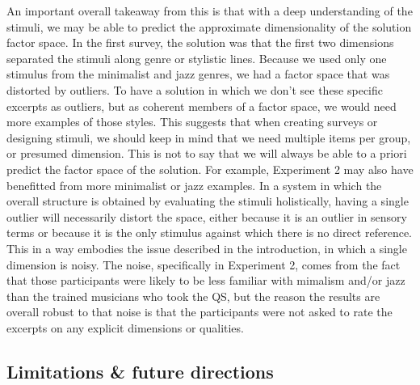 \documentclass[
  english,
  man,floatsintext]{apa6}
\begin{document}
An important overall takeaway from this is that with a deep understanding of the stimuli, we may be able to predict the approximate dimensionality of the solution factor space. In the first survey, the solution was that the first two dimensions separated the stimuli along genre or stylistic lines. Because we used only one stimulus from the minimalist and jazz genres, we had a factor space that was distorted by outliers. To have a solution in which we don't see these specific excerpts as outliers, but as coherent members of a factor space, we would need more examples of those styles. This suggests that when creating surveys or designing stimuli, we should keep in mind that we need multiple items per group, or presumed dimension. This is not to say that we will always be able to a priori predict the factor space of the solution. For example, Experiment 2 may also have benefitted from more minimalist or jazz examples. In a system in which the overall structure is obtained by evaluating the stimuli holistically, having a single outlier will necessarily distort the space, either because it is an outlier in sensory terms or because it is the only stimulus against which there is no direct reference. This in a way embodies the issue described in the introduction, in which a single dimension is noisy. The noise, specifically in Experiment 2, comes from the fact that those participants were likely to be less familiar with mimalism and/or jazz than the trained musicians who took the QS, but the reason the results are overall robust to that noise is that the participants were not asked to rate the excerpts on any explicit dimensions or qualities.

\hypertarget{limitations-future-directions}{%
\subsection{Limitations \& future directions}\label{limitations-future-directions}}
\end{document}
